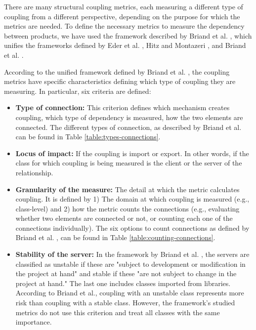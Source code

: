 There are many structural coupling metrics, each measuring a different type of coupling from a different perspective, depending on the purpose for which the metrics are needed. To define the necessary metrics to measure the dependency between products, we have used the framework described by Briand et al. \cite{briand1999unified}, which unifies the frameworks defined by Eder et al. \cite{eder1994coupling}, Hitz and Montazeri \cite{hitz1995measuring}, and Briand et al. \cite{briand1997investigation}.

According to the unified framework defined by Briand et al. \cite{briand1999unified}, the coupling metrics have specific characteristics defining which type of coupling they are measuring. In particular, six criteria are defined:

\begin{itemize}
  \item \textbf{Type of connection:} This criterion defines which mechanism creates coupling, which type of dependency is measured, how the two elements are connected. The different types of connection, as described by Briand et al. \cite{briand1999unified} can be found in Table \ref{table:types-connections}.

  \item \textbf{Locus of impact:} If the coupling is import or export. In other words, if the class for which coupling is being measured is the client or the server of the relationship.

  \item \textbf{Granularity of the measure:} The detail at which the metric calculates coupling. It is defined by 1) The domain at which coupling is measured (e.g., class-level) and 2) how the metric counts the connections (e.g., evaluating whether two elements are connected or not, or counting each one of the connections individually). The six options to count connections as defined by Briand et al. \cite{briand1999unified}, can be found in Table \ref{table:counting-connections}.

  \item \textbf{Stability of the server:} In the framework by Briand et al. \cite{briand1999unified}, the servers are classified as unstable if these are  "subject to development or modification in the project at hand" and stable if these "are not subject to change in the project at hand." The last one includes classes imported from libraries. According to Briand et al., coupling with an unstable class represents more risk than coupling with a stable class. However, the framework's studied metrics do not use this criterion and treat all classes with the same importance.


\end{itemize}
